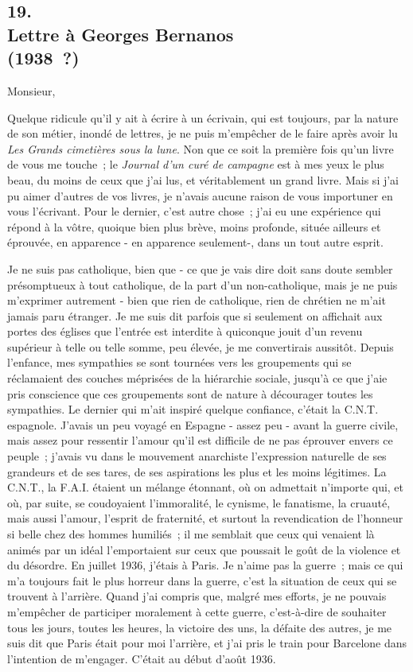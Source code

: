 \documentclass[french,twoside]{book} %
\begin{document}
\subsection[{19. Lettre à Georges Bernanos, (1938 ?)}]{19. \\
Lettre à Georges Bernanos \\
(1938 ?)}
\noindent \par
Monsieur,\par
Quelque ridicule qu'il y ait à écrire à un écrivain, qui est toujours, par la nature de son métier, inondé de lettres, je ne puis m'empêcher de le faire après avoir lu {\itshape Les Grands cimetières sous la lune}. Non que ce soit la première fois qu'un livre de vous me touche ; le {\itshape Journal d'un curé de campagne} est à mes yeux le plus beau, du moins de ceux que j'ai lus, et véritablement un grand livre. Mais si j'ai pu aimer d'autres de vos livres, je n'avais aucune raison de vous importuner en vous l'écrivant. Pour le dernier, c'est autre chose ; j'ai eu une expérience qui répond à la vôtre, quoique bien plus brève, moins pro­fonde, située ailleurs et éprouvée, en apparence - en apparence seulement-, dans un tout autre esprit.\par
Je ne suis pas catholique, bien que - ce que je vais dire doit sans doute sembler présomptueux à tout catholique, de la part d'un non-catholique, mais je ne puis m'exprimer autrement - bien que rien de catholique, rien de chrétien ne m'ait jamais paru étranger. Je me suis dit parfois que si seulement on affichait aux portes des églises que l'entrée est interdite à quiconque jouit d'un revenu supérieur à telle ou telle somme, peu élevée, je me convertirais aussi­tôt. Depuis l'enfance, mes sympathies se sont tournées vers les groupements qui se réclamaient des couches méprisées de la hiérarchie sociale, jusqu'à ce que j'aie pris conscience que ces groupements sont de nature à décourager toutes les sympathies. Le dernier qui m'ait inspiré quelque confiance, c'était la C.N.T. espagnole. J'avais un peu voyagé en Espagne - assez peu - avant la guerre civile, mais assez pour ressentir l'amour qu'il est difficile de ne pas éprouver envers ce peuple ; j'avais vu dans le mouvement anarchiste l'expres­sion naturelle de ses grandeurs et de ses tares, de ses aspirations les plus et les moins légitimes. La C.N.T., la F.A.I. étaient un mélange étonnant, où on admettait n'importe qui, et où, par suite, se coudoyaient l'immoralité, le cynisme, le fanatisme, la cruauté, mais aussi l'amour, l'esprit de fraternité, et surtout la revendication de l'honneur si belle chez des hommes humiliés ; il me semblait que ceux qui venaient là animés par un idéal l'emportaient sur ceux que poussait le goût de la violence et du désordre. En juillet 1936, j'étais à Paris. Je n'aime pas la guerre ; mais ce qui m'a toujours fait le plus horreur dans la guerre, c'est la situation de ceux qui se trouvent à l'arrière. Quand j'ai compris que, malgré mes efforts, je ne pouvais m'empêcher de participer moralement à cette guerre, c'est-à-dire de souhaiter tous les jours, toutes les heures, la victoire des uns, la défaite des autres, je me suis dit que Paris était pour moi l'arrière, et j'ai pris le train pour Barcelone dans l'intention de m'engager. C'était au début d'août 1936.\par
\end{document}
